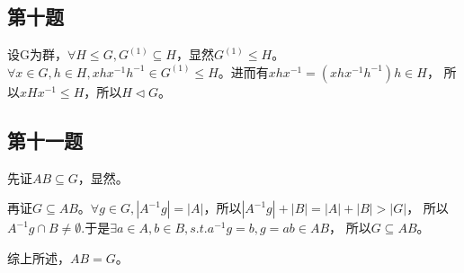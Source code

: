 \documentclass[12pt,onecolumn]{article}
\theoremstyle{plain}
\begin{document}
\subsection{第十题}
\begin{proof*}
  设G为群，$\forall H \leq G, G^{(1)} \subseteq H$，显然$G^{(1)} \leq H$。
  $\forall x \in G, h \in H, xhx^{-1}h^{-1} \in G^{(1)} \leq H$。进而有$xhx^{-1} = (xhx^{-1}h^{-1})h \in H$，
  所以$xHx^{-1} \leq H$，所以$H \triangleleft G$。
\end{proof*}

\subsection{第十一题}
\begin{proof*}
  先证$AB \subseteq G$，显然。

  再证$G \subseteq AB$。$\forall g \in G, |A^{-1}g| = |A|$，所以$|A^{-1}g| + |B| = |A| + |B| > |G|$，
  所以$A^{-1}g \cap B \neq \emptyset$.于是$\exists a \in A, b \in B, s.t. a^{-1}g = b, g = ab \in AB$，
  所以$G \subseteq AB$。

  综上所述，$AB = G$。
\end{proof*}
\end{document}
